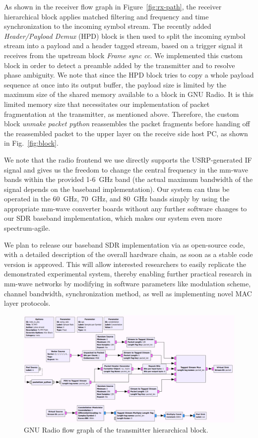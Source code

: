 \documentclass{sig-alternate}
\begin{document}
As shown in the receiver flow graph in Figure~\ref{fig:rx-path}, the receiver hierarchical block applies matched filtering and frequency and time synchronization to the incoming symbol stream. The recently added \textit{Header/Payload Demux} (HPD) block is then used to split the incoming symbol stream into a payload and a header tagged stream, based on a trigger signal it receives from the upstream block \textit{Frame sync cc}. We implemented this custom block in order to detect a preamble added by the transmitter and to resolve phase ambiguity. We note that since the HPD block tries to copy a whole payload sequence at once into its output buffer, the payload size is limited by the maximum size of the shared memory available to a block in GNU Radio. It is this limited memory size that necessitates our implementation of packet fragmentation at the transmitter, as mentioned above. Therefore, the custom block \textit{unmake packet python} reassembles the packet fragments before handing off the reassembled packet to the upper layer on the receive side host PC, as shown in Fig.~\ref{fig:block}.

We note that the radio frontend we use directly supports the USRP-generated IF signal and gives us the freedom to change the central frequency in the mm-wave bands within the provided 1-6~GHz band (the actual maximum bandwidth of the signal depends on the baseband implementation).  Our system can thus be operated in the 60~GHz, 70~GHz, and 80~GHz bands simply by using the appropriate mm-wave converter boards without any further software changes to our SDR baseband implementation, which makes our system even more spectrum-agile.

We plan to release our baseband SDR implementation via \cite{gr-inets} as open-source code, with a detailed description of the overall hardware chain, as soon as a stable code version is approved. This will allow interested researchers to easily replicate the demonstrated experimental system, thereby enabling further practical research in mm-wave networks by modifying in software parameters like modulation scheme, channel bandwidth, synchronization method, as well as implementing novel MAC layer protocols.

\begin{figure}[p]
\center
\includegraphics[scale=0.41]{tx_path.png}
\caption{GNU Radio flow graph of the transmitter hierarchical block.}
\label{fig:tx-path}
\end{figure}
\end{document}
